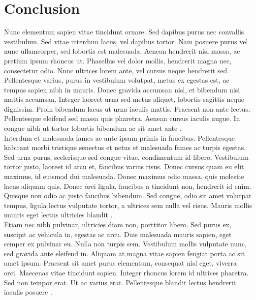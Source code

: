 \section{Conclusion}

Nunc elementum sapien vitae tincidunt ornare. Sed dapibus purus nec convallis vestibulum. Sed vitae interdum lacus, vel dapibus tortor. Nam posuere purus vel nunc ullamcorper, sed lobortis est malesuada. Aenean hendrerit nisl massa, ac pretium ipsum rhoncus ut. Phasellus vel dolor mollis, hendrerit magna nec, consectetur odio. Nunc ultrices lorem ante, vel cursus neque hendrerit sed. Pellentesque varius, purus in vestibulum volutpat, metus ex egestas est, ac tempus sapien nibh in mauris. Donec gravida accumsan nisl, et bibendum nisi mattis accumsan. Integer laoreet urna sed metus aliquet, lobortis sagittis neque dignissim. Proin bibendum lacus ut urna iaculis mattis. Praesent non ante lectus. Pellentesque eleifend sed massa quis pharetra. Aenean cursus iaculis augue. In congue nibh ut tortor lobortis bibendum ac sit amet ante \parencite[prenote][]{latexcompanion}.\\

Interdum et malesuada fames ac ante ipsum primis in faucibus. Pellentesque habitant morbi tristique senectus et netus et malesuada fames ac turpis egestas. Sed urna purus, scelerisque sed congue vitae, condimentum id libero. Vestibulum tortor justo, laoreet id arcu et, faucibus varius risus. Donec cursus quam eu elit maximus, id euismod dui malesuada. Donec maximus odio massa, quis molestie lacus aliquam quis. Donec orci ligula, faucibus a tincidunt non, hendrerit id enim. Quisque non odio ac justo faucibus bibendum. Sed congue, odio sit amet volutpat tempus, ligula lectus vulputate tortor, a ultrices sem nulla vel risus. Mauris mollis mauris eget lectus ultricies blandit \parencite{knuthwebsite}.\\

Etiam nec nibh pulvinar, ultricies diam non, porttitor libero. Sed purus ex, suscipit ac vehicula in, egestas ac arcu. Duis malesuada mauris sapien, eget semper ex pulvinar eu. Nulla non turpis sem. Vestibulum mollis vulputate nunc, sed gravida ante eleifend in. Aliquam at magna vitae sapien feugiat porta ac sit amet ipsum. Praesent sit amet purus elementum, consequat nisl eget, viverra orci. Maecenas vitae tincidunt sapien. Integer rhoncus lorem id ultrices pharetra. Sed non tempor erat. Ut ac varius erat. Pellentesque blandit lectus hendrerit iaculis posuere \parencite[see][page 4]{einstein}.